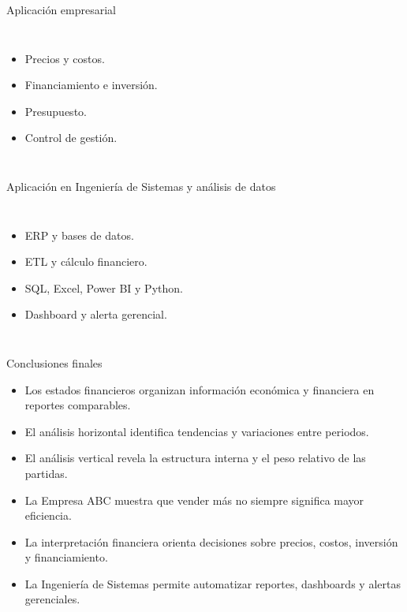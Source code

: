 \begin{frame}{Aplicación empresarial}
  \begin{columns}[T,onlytextwidth]
    \begin{itemize}
      \item Precios y costos.
      \item Financiamiento e inversión.
      \item Presupuesto.
      \item Control de gestión.
    \end{itemize}
  \end{columns}
\end{frame}

\begin{frame}{Aplicación en Ingeniería de Sistemas y análisis de datos}
  \begin{columns}[T,onlytextwidth]
    \begin{itemize}
      \item ERP y bases de datos.
      \item ETL y cálculo financiero.
      \item SQL, Excel, Power BI y Python.
      \item Dashboard y alerta gerencial.
    \end{itemize}
  \end{columns}
\end{frame}

\begin{frame}{Conclusiones finales}
  \footnotesize
  \begin{itemize}
    \item Los estados financieros organizan información económica y financiera en reportes comparables.
    \item El análisis horizontal identifica tendencias y variaciones entre periodos.
    \item El análisis vertical revela la estructura interna y el peso relativo de las partidas.
    \item La Empresa ABC muestra que vender más no siempre significa mayor eficiencia.
    \item La interpretación financiera orienta decisiones sobre precios, costos, inversión y financiamiento.
    \item La Ingeniería de Sistemas permite automatizar reportes, dashboards y alertas gerenciales.
  \end{itemize}
\end{frame}
